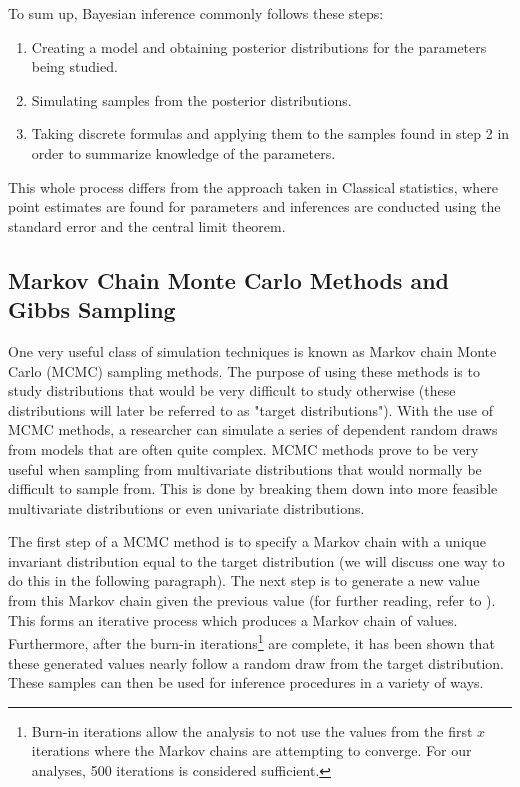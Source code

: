 \documentclass[11pt, oneside]{article}
\begin{document}
To sum up, Bayesian inference commonly follows these steps:
\begin{enumerate}
\item Creating a model and obtaining posterior distributions for the parameters being studied.
\item Simulating samples from the posterior distributions.
\item Taking discrete formulas and applying them to the samples found in step 2 in order to summarize knowledge of the parameters.
\end{enumerate}

This whole process differs from the approach taken in Classical statistics, where point estimates are found for parameters and inferences are conducted using the standard error and the central limit theorem.

\subsection{Markov Chain Monte Carlo Methods and Gibbs Sampling}

One very useful class of simulation techniques is known as Markov chain Monte Carlo (MCMC) sampling methods. The purpose of using these methods is to study distributions  that would be very difficult to study otherwise (these distributions will later be referred to as "target distributions"). With the use of MCMC methods, a researcher can simulate a series of dependent random draws from models that are often quite complex. MCMC methods prove to be very useful when sampling from multivariate distributions that would normally be difficult to sample from. This is done by breaking them down into more feasible multivariate distributions or even univariate distributions.

The first step of a MCMC method is to specify a Markov chain with a unique invariant distribution equal to the target distribution (we will discuss one way to do this in the following paragraph). The next step is to generate a new value from this Markov chain given the previous value (for further reading, refer to \cite{Berg}). This forms an iterative process which produces a Markov chain of values. Furthermore, after the burn-in iterations\footnote{Burn-in iterations allow the analysis to not use the values from the first $x$ iterations where the Markov chains are attempting to converge. For our analyses, 500 iterations is considered sufficient.} are complete, it has been shown that these generated values nearly follow a random draw from the target distribution. These samples can then be used for inference procedures in a variety of ways. 
\end{document}
